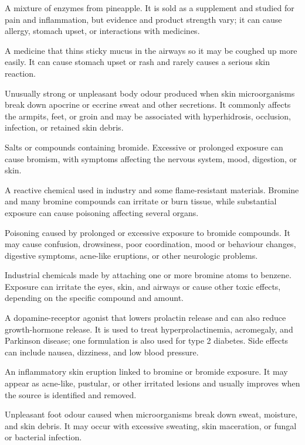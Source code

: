  A mixture of enzymes from pineapple. It is sold as a supplement and studied for pain and inflammation, but evidence and product strength vary; it can cause allergy, stomach upset, or interactions with medicines.

 A medicine that thins sticky mucus in the airways so it may be coughed up more easily. It can cause stomach upset or rash and rarely causes a serious skin reaction.

 Unusually strong or unpleasant body odour produced
when skin microorganisms break down apocrine or eccrine sweat and other
secretions. It commonly affects the armpits, feet, or groin and may be
associated with hyperhidrosis, occlusion, infection, or retained skin debris.

 Salts or compounds containing bromide. Excessive or prolonged exposure can cause bromism, with symptoms affecting the nervous system, mood, digestion, or skin.

 A reactive chemical used in industry and some flame-resistant materials. Bromine and many bromine compounds can irritate or burn tissue, while substantial exposure can cause poisoning affecting several organs.

 Poisoning caused by prolonged or excessive exposure to bromide compounds. It may cause confusion, drowsiness, poor coordination, mood or behaviour changes, digestive symptoms, acne-like eruptions, or other neurologic problems.

 Industrial chemicals made by attaching one or more bromine atoms to benzene. Exposure can irritate the eyes, skin, and airways or cause other toxic effects, depending on the specific compound and amount.

 A dopamine-receptor agonist that lowers prolactin release and can also reduce growth-hormone release. It is used to treat hyperprolactinemia, acromegaly, and Parkinson disease; one formulation is also used for type 2 diabetes. Side effects can include nausea, dizziness, and low blood pressure.

 An inflammatory skin eruption linked to bromine or bromide exposure. It may appear as acne-like, pustular, or other irritated lesions and usually improves when the source is identified and removed.

 Unpleasant foot odour caused when microorganisms break
down sweat, moisture, and skin debris. It may occur with excessive sweating,
skin maceration, or fungal or bacterial infection.


